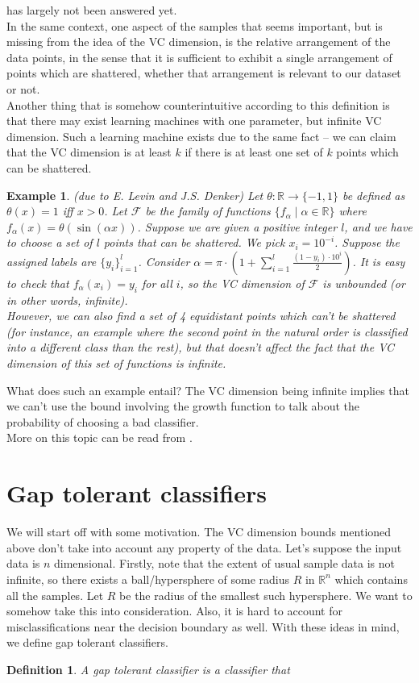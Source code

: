 \documentclass[11pt]{article}
\newcommand{\nl}{\vspace*{0.3cm}\\}
\newcounter{topic} \setcounter{topic}{0}
\newtheorem{example}[theorem]{Example}
\newtheorem{definition}{Definition}[section]
\begin{document}
has largely not been answered yet.\nl
In the same context, one aspect of the samples that seems important, but is missing from the idea of the VC dimension, is the relative arrangement of the data points, in the sense that it is
sufficient to exhibit a single arrangement of points which are shattered, whether that arrangement is relevant to our dataset or not.\nl
Another thing that is somehow counterintuitive according to this definition is that there may exist learning machines with one parameter, but infinite VC dimension. Such a learning machine exists
due to the same fact -- we can claim that the VC dimension is at least $k$ if there is at least one set of $k$ points which can be shattered.
\begin{example}
    (due to E. Levin and J.S. Denker) Let $\theta : \mathbb{R} \to \{-1, 1\}$ be defined as $\theta(x) = 1$ iff $x > 0$. Let $\mathcal{F}$ be the family of functions $\{f_\alpha \mid \alpha \in
    \mathbb{R}\}$ where $f_\alpha(x) = \theta(\sin(\alpha x))$. Suppose we are given a positive integer $l$, and we have to choose a set of $l$ points that can be shattered. We pick $x_i =
    10^{-i}$. Suppose the assigned labels are $\{y_i\}_{i = 1}^l$. Consider $\alpha = \pi \cdot \left(1 + \sum_{i = 1}^l \frac{(1 - y_i) \cdot 10^i}{2} \right)$. It is easy to check that
    $f_\alpha(x_i) = y_i$ for all $i$, so the VC dimension of $\mathcal{F}$ is unbounded (or in other words, infinite).\nl
    However, we can also find a set of 4 equidistant points which can't be shattered (for instance, an example where the second point in the natural order is classified into a different class than
    the rest), but that doesn't affect the fact that the VC dimension of this set of functions is infinite.
\end{example}
What does such an example entail? The VC dimension being infinite implies that we can't use the bound involving the growth function to talk about the probability of choosing a bad
classifier.\nl
More on this topic can be read from \cite{burges}.
\section{Gap tolerant classifiers}

We will start off with some motivation. The VC dimension bounds mentioned above don't take into account any property of the data. Let's suppose the input data is $n$ dimensional. Firstly, note that the extent of usual sample data is not infinite, so there exists a
ball/hypersphere of some radius $R$ in $\mathbb{R}^n$ which contains all the samples. Let $R$ be the radius of the smallest such hypersphere. We want to somehow take this into consideration. Also, it
is hard to account for misclassifications near the decision boundary as well. With these ideas in mind, we define gap tolerant classifiers.
\begin{definition}
    A gap tolerant classifier is a classifier that
\end{definition}
	
\end{document}
